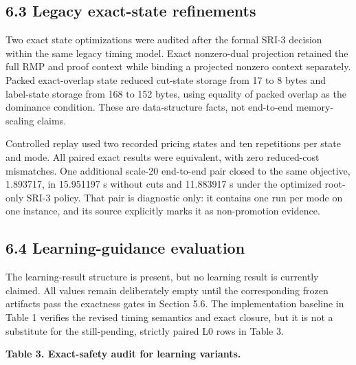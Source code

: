 \documentclass[
  11pt,
]{article}
\begin{document}
\hypertarget{legacy-exact-state-refinements}{%
\subsection{6.3 Legacy exact-state
refinements}\label{legacy-exact-state-refinements}}

Two exact state optimizations were audited after the formal SRI-3
decision within the same legacy timing model. Exact nonzero-dual
projection retained the full RMP and proof context while binding a
projected nonzero context separately. Packed exact-overlap state reduced
cut-state storage from 17 to 8 bytes and label-state storage from 168 to
152 bytes, using equality of packed overlap as the dominance condition.
These are data-structure facts, not end-to-end memory-scaling claims.

Controlled replay used two recorded pricing states and ten repetitions
per state and mode. All paired exact results were equivalent, with zero
reduced-cost mismatches. One additional scale-20 end-to-end pair closed
to the same objective, 1.893717, in 15.951197 s without cuts and
11.883917 s under the optimized root-only SRI-3 policy. That pair is
diagnostic only: it contains one run per mode on one instance, and its
source explicitly marks it as non-promotion evidence.

\hypertarget{learning-guidance-evaluation}{%
\subsection{6.4 Learning-guidance
evaluation}\label{learning-guidance-evaluation}}

The learning-result structure is present, but no learning result is
currently claimed. All values remain deliberately empty until the
corresponding frozen artifacts pass the exactness gates in Section 5.6.
The implementation baseline in Table 1 verifies the revised timing
semantics and exact closure, but it is not a substitute for the
still-pending, strictly paired L0 rows in Table 3.

\textbf{Table 3. Exact-safety audit for learning variants.}
\end{document}
